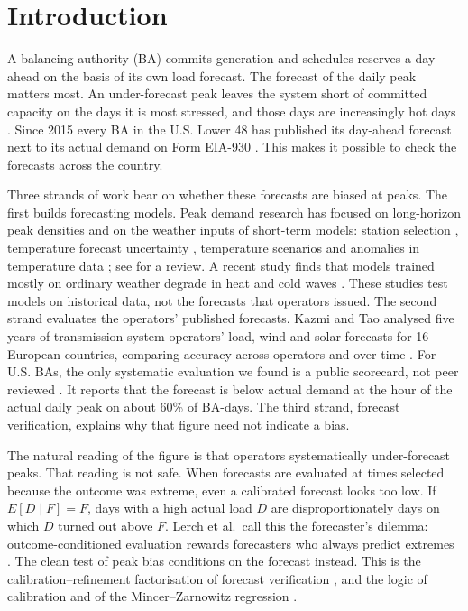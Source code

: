\documentclass[conference,a4paper]{IEEEtran}
\begin{document}
\section{Introduction}

A balancing authority (BA) commits generation and schedules reserves a day ahead on the basis of its own load forecast. The forecast of the daily peak matters most. An under-forecast peak leaves the system short of committed capacity on the days it is most stressed, and those days are increasingly hot days \cite{auffhammer2017climate}. Since 2015 every BA in the U.S. Lower 48 has published its day-ahead forecast next to its actual demand on Form EIA-930 \cite{eia930}. This makes it possible to check the forecasts across the country.

Three strands of work bear on whether these forecasts are biased at peaks. The first builds forecasting models. Peak demand research has focused on long-horizon peak densities \cite{hyndman2010density} and on the weather inputs of short-term models: station selection \cite{hong2015weather}, temperature forecast uncertainty \cite{douglas1998impacts}, temperature scenarios \cite{xie2018temperature} and anomalies in temperature data \cite{sobhani2020temperature}; see \cite{hong2016probabilistic} for a review. A recent study finds that models trained mostly on ordinary weather degrade in heat and cold waves \cite{lu2026heat}. These studies test models on historical data, not the forecasts that operators issued. The second strand evaluates the operators' published forecasts. Kazmi and Tao analysed five years of transmission system operators' load, wind and solar forecasts for 16 European countries, comparing accuracy across operators and over time \cite{kazmi2022tso}. For U.S. BAs, the only systematic evaluation we found is a public scorecard, not peer reviewed \cite{cardinalgrid2026,guerrafilho2026note}. It reports that the forecast is below actual demand at the hour of the actual daily peak on about 60\% of BA-days. The third strand, forecast verification, explains why that figure need not indicate a bias.

The natural reading of the figure is that operators systematically under-forecast peaks. That reading is not safe. When forecasts are evaluated at times selected because the outcome was extreme, even a calibrated forecast looks too low. If $E[D\mid F]=F$, days with a high actual load $D$ are disproportionately days on which $D$ turned out above $F$. Lerch et al.\ call this the forecaster's dilemma: outcome-conditioned evaluation rewards forecasters who always predict extremes \cite{lerch2017dilemma}. The clean test of peak bias conditions on the forecast instead. This is the calibration--refinement factorisation of forecast verification \cite{murphy1987framework}, and the logic of calibration and of the Mincer--Zarnowitz regression \cite{gneiting2011point,mincer1969evaluation,murphy1993good}.
\end{document}
